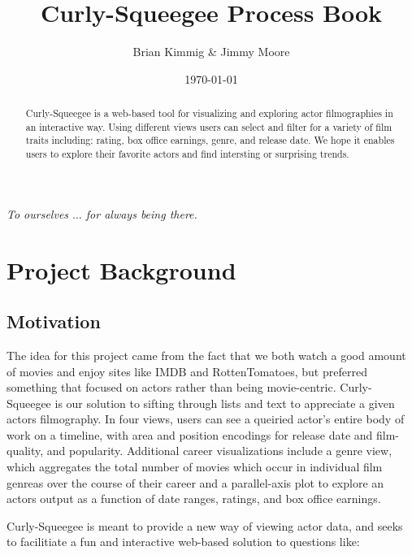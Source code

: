 \documentclass[12pt]{article}
\title{Curly-Squeegee Process Book}
\author{ Brian Kimmig \& Jimmy Moore}
\date{\today}
\begin{document}
\maketitle

\begin{abstract}
	Curly-Squeegee is a web-based tool for visualizing and exploring actor filmographies in an interactive way. Using different views users can select and filter for a variety of film traits including: rating, box office earnings, genre, and release date.  We hope it enables users to explore their favorite actors and find intersting or surprising trends.
\end{abstract}

\newpage

\tableofcontents

\newpage


\begin{center}

	\vspace*{\fill}
	\textit{To ourselves $\dots$ for always being there.}
	\vspace*{\fill}
	
\end{center}

\newpage 


\section{Project Background}

\subsection{Motivation}\label{sec:Motivation}
	The idea for this project came from the fact that we both watch a good amount of movies and enjoy sites like IMDB and RottenTomatoes, but preferred something that focused on actors rather than being movie-centric. Curly-Squeegee is our solution to sifting through lists and text to appreciate a given actors filmography. In four views, users can see a queiried actor's entire body of work on a timeline, with area and position encodings for release date and film-quality, and popularity. Additional career visualizations include a genre view, which aggregates the total number of movies which occur in individual film genreas over the course of their career and a parallel-axis plot to explore an actors output as a function of date ranges, ratings, and box office earnings.
	
	Curly-Squeegee is meant to provide a new way of viewing actor data, and seeks to facilitiate a fun and interactive web-based solution to questions like:
\end{document}
